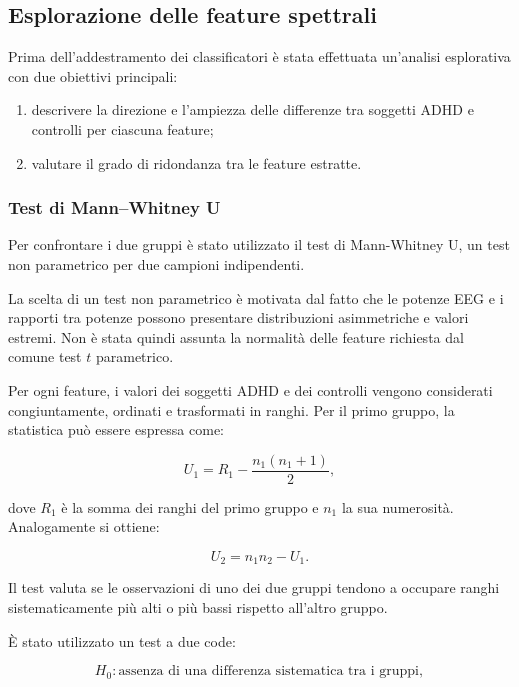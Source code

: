 \subsection{Esplorazione delle feature spettrali}

Prima dell'addestramento dei classificatori è stata effettuata
un'analisi esplorativa con due obiettivi principali:

\begin{enumerate}
	\item descrivere la direzione e l'ampiezza delle differenze tra
	soggetti ADHD e controlli per ciascuna feature;
	
	\item valutare il grado di ridondanza tra le feature estratte.
\end{enumerate}


\subsubsection{Test di Mann--Whitney U}

Per confrontare i due gruppi è stato utilizzato il test di
Mann-Whitney U, un test non parametrico per due campioni indipendenti.

La scelta di un test non parametrico è motivata dal fatto che le
potenze EEG e i rapporti tra potenze possono presentare distribuzioni
asimmetriche e valori estremi. Non è stata quindi assunta la normalità
delle feature richiesta dal comune test $t$ parametrico.

Per ogni feature, i valori dei soggetti ADHD e dei controlli vengono
considerati congiuntamente, ordinati e trasformati in ranghi. Per il
primo gruppo, la statistica può essere espressa come:

\begin{equation}
	U_1
	=
	R_1
	-
	\frac{n_1(n_1+1)}{2},
\end{equation}

dove $R_1$ è la somma dei ranghi del primo gruppo e $n_1$ la sua
numerosità. Analogamente si ottiene:

\begin{equation}
	U_2
	=
	n_1n_2-U_1.
\end{equation}

Il test valuta se le osservazioni di uno dei due gruppi tendono a
occupare ranghi sistematicamente più alti o più bassi rispetto
all'altro gruppo.

È stato utilizzato un test a due code:

\begin{equation}
	H_0:
	\text{assenza di una differenza sistematica tra i gruppi},
\end{equation}

